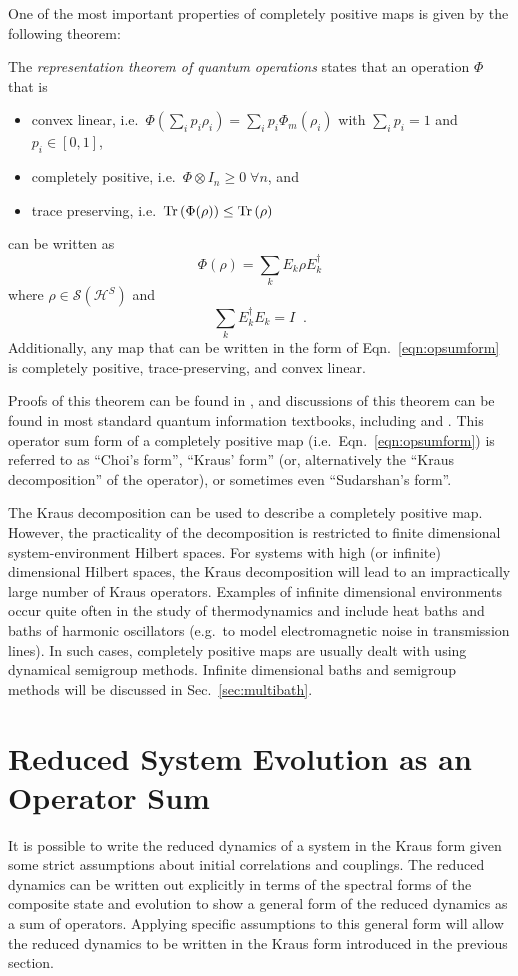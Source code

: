 One of the most important properties of completely positive maps is given by the following theorem: 
\begin{theorem}
The {\em representation theorem of quantum operations} states that an operation $\Phi$ that is
\begin{itemize}
\item convex linear, i.e.\ $\Phi\left(\sum_i p_i\rho_i\right)=\sum_ip_i\Phi_m(\rho_i)$ with $\sum_i p_i = 1$ and $p_i\in[0,1]$, 
\item completely positive, i.e.\ $\Phi \otimes I_n \ge 0 \;\forall n$, and
\item trace preserving, i.e.\ $\operatorname{Tr}\left(\Phi(\rho)\right)\le\operatorname{Tr}\left(\rho\right)$
\end{itemize}
can be written as
\begin{equation}
\label{eqn:opsumform}
\Phi(\rho)  = \sum_k E_{k}\rho E_{k}^\dagger
\end{equation}
where $\rho\in\mathcal{S}(\mathcal{H}^S)$ and 
$$
\sum_k E_{k}^\dagger E_{k}= I\;\;.
$$
Additionally, any map that can be written in the form of Eqn.\ \ref{eqn:opsumform} is completely positive, trace-preserving, and convex linear.
\end{theorem}
Proofs of this theorem can be found in \cite{Breuer2007,Kraus1983}, and discussions of this theorem can be found in most standard quantum information textbooks, including \cite{Nielsen2010} and \cite{Preskill2004}.  This operator sum form of a completely positive map (i.e.\ Eqn.\ \ref{eqn:opsumform}) is referred to as ``Choi's form'', ``Kraus' form'' (or, alternatively the ``Kraus decomposition'' of the operator), or sometimes even ``Sudarshan's form''.   

The Kraus decomposition can be used to describe a completely positive map.  However, the practicality of the decomposition is restricted to finite dimensional system-environment Hilbert spaces.  For systems with high (or infinite) dimensional Hilbert spaces, the Kraus decomposition will lead to an impractically large number of Kraus operators.  Examples of infinite dimensional environments occur quite often in the study of thermodynamics and include heat baths and baths of harmonic oscillators (e.g.\ to model electromagnetic noise in transmission lines).  In such cases, completely positive maps are usually dealt with using dynamical semigroup methods.  Infinite dimensional baths and semigroup methods will be discussed in Sec.\ \ref{sec:multibath}.

\section{Reduced System Evolution as an Operator Sum}
\label{sec:redsysopform}
It is possible to write the reduced dynamics of a system in the Kraus form given some strict assumptions about initial correlations and couplings.  The reduced dynamics can be written out explicitly in terms of the spectral forms of the composite state and evolution to show a general form of the reduced dynamics as a sum of operators.  Applying specific assumptions to this general form will allow the reduced dynamics to be written in the Kraus form introduced in the previous section.

